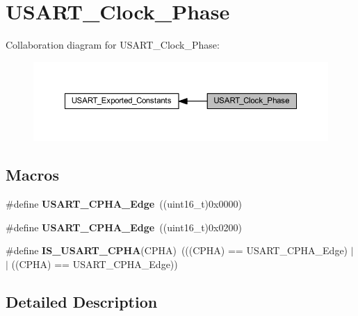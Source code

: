 \hypertarget{group___u_s_a_r_t___clock___phase}{}\section{U\+S\+A\+R\+T\+\_\+\+Clock\+\_\+\+Phase}
\label{group___u_s_a_r_t___clock___phase}
Collaboration diagram for U\+S\+A\+R\+T\+\_\+\+Clock\+\_\+\+Phase\+:\nopagebreak
\begin{figure}[H]
\begin{center}
\leavevmode
\includegraphics[width=350pt]{group___u_s_a_r_t___clock___phase}
\end{center}
\end{figure}
\subsection*{Macros}
\begin{DoxyCompactItemize}
\item 
\mbox{\label{group___u_s_a_r_t___clock___phase_gab6c0fb052fb9bc418cf368c1a0e4643b}} 
\#define {\bfseries U\+S\+A\+R\+T\+\_\+\+C\+P\+H\+A\+\_\+Edge}~((uint16\+\_\+t)0x0000)
\item 
\mbox{\label{group___u_s_a_r_t___clock___phase_ga66344d0725f1300e9d0f8f1708111f25}} 
\#define {\bfseries U\+S\+A\+R\+T\+\_\+\+C\+P\+H\+A\+\_\+Edge}~((uint16\+\_\+t)0x0200)
\item 
\mbox{\label{group___u_s_a_r_t___clock___phase_ga66fa1a3a757025fcd8dd069a90689f88}} 
\#define {\bfseries I\+S\+\_\+\+U\+S\+A\+R\+T\+\_\+\+C\+P\+HA}(C\+P\+HA)~(((C\+P\+HA) == U\+S\+A\+R\+T\+\_\+\+C\+P\+H\+A\+\_\+Edge) $\vert$$\vert$ ((C\+P\+HA) == U\+S\+A\+R\+T\+\_\+\+C\+P\+H\+A\+\_\+Edge))
\end{DoxyCompactItemize}


\subsection{Detailed Description}

